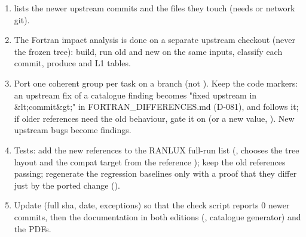 \begin{enumerate}
\item {} lists the newer upstream commits and the files they touch (needs  or network git).
\item The Fortran impact analysis is done on a separate upstream checkout (never the frozen  tree): build,
run old and new on the same inputs, classify each commit, produce  and L1 tables.
\item Port one coherent group per task on a branch (not ). Keep the code markers: an upstream fix of a catalogue
finding becomes "fixed upstream in \&lt;commit\&gt;" in FORTRAN\_\allowbreak{}DIFFERENCES.md (D-081), and  follows
it; if older references need the old behaviour, gate it on  (or a new 
value, ). New upstream bugs become  findings.
\item Tests: add the new references to the RANLUX full-run list (,  chooses the
tree layout and the compat target from the reference ); keep the old references passing; regenerate the
regression baselines only with a proof that they differ just by the ported change
().
\item Update  (full sha, date, exceptions) so that the check script reports 0 newer commits, then the
documentation in both editions (, catalogue generator) and the
PDFs.
\end{enumerate}
